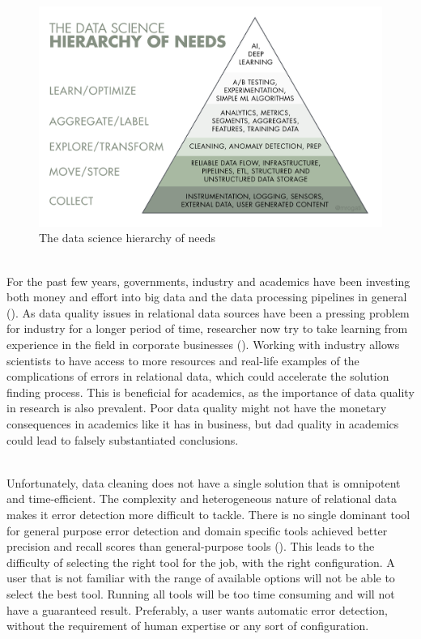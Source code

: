 \begin{figure}
    \centering
    \includegraphics[width=\linewidth]{thesis/Figures/PyramidData.png}
    \caption[The data science hierarchy of needs]{The data science hierarchy of needs\footnotemark}
    \label{fig:pyramid_data}
\end{figure}

~\\For the past few years, governments, industry and academics have been investing both money and effort into big data and the data processing pipelines in general (\cite{Cai2015-hr}). As data quality issues in relational data sources have been a pressing problem for industry for a longer period of time, researcher now try to take learning from experience in the field in corporate businesses (\cite{Stonebraker2018-ag}). Working with industry allows scientists to have access to more resources and real-life examples of the complications of errors in relational data, which could accelerate the solution finding process. This is beneficial for academics, as the importance of data quality in research is also prevalent. Poor data quality might not have the monetary consequences in academics like it has in business, but dad quality in academics could lead to falsely substantiated conclusions. 

~\\Unfortunately, data cleaning does not have a single solution that is omnipotent and time-efficient. The complexity and heterogeneous nature of relational data makes it error detection more difficult to tackle. There is no single dominant tool for general purpose error detection and domain specific tools achieved better precision and recall scores than general-purpose tools (\cite{Abedjan2016-jc}). 
This leads to the difficulty of selecting the right tool for the job, with the right configuration. A user that is not familiar with the range of available options will not be able to select the best tool. Running all tools will be too time consuming and will not have a guaranteed result. Preferably, a user wants automatic error detection, without the requirement of human expertise or any sort of configuration.

